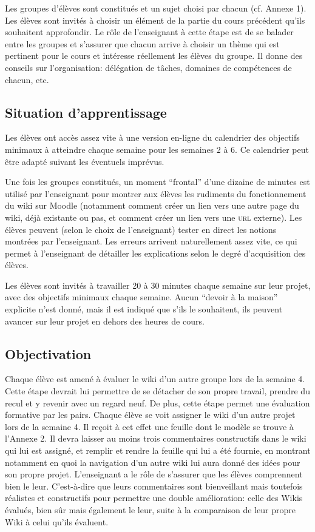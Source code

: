 \documentclass[11pt,bibliography=totoc]{scrartcl}
\newcommand\ajout[1]{{\color{blue} #1}}
\begin{document}
Les groupes d'élèves sont constitués et un sujet choisi par chacun (cf. Annexe
1). Les élèves sont invités à choisir un élément de la partie du cours précédent
qu'ils souhaitent approfondir. Le rôle de l'enseignant à cette étape est de se
balader entre les groupes et s'assurer que chacun arrive à choisir un thème qui
est pertinent pour le cours et intéresse réellement les élèves du groupe. \ajout {Il donne des conseils sur l'organisation: délégation de tâches, domaines de compétences de chacun, etc.}

\subsection{Situation d'apprentissage}
Les élèves ont accès assez vite à une version en-ligne du calendrier des
objectifs minimaux à atteindre chaque semaine pour les semaines 2 à 6. Ce
calendrier peut être adapté suivant les éventuels imprévus.

Une fois les groupes constitués, un moment ``frontal'' d'une dizaine de minutes
est utilisé par l'enseignant pour montrer aux élèves les rudiments du
fonctionnement du wiki sur Moodle (notamment comment créer un lien vers une
autre page du wiki, déjà existante ou pas, et comment créer un lien vers une
\textsc{url} externe). \ajout {Les élèves peuvent (selon le choix de l'enseignant) tester en direct les notions montrées par l'enseignant. Les erreurs arrivent naturellement assez vite, ce qui permet à l'enseignant de détailler les explications selon le degré d'acquisition des élèves.}

Les élèves sont invités à travailler 20 à 30 minutes chaque semaine sur leur
projet, avec des objectifs minimaux chaque semaine. Aucun ``devoir à la maison''
explicite n'est donné, mais il est indiqué que s'ils le souhaitent, ils peuvent
avancer sur leur projet en dehors des heures de cours.

\subsection{Objectivation}
Chaque élève est amené à évaluer le wiki d'un autre groupe lors de la semaine
4. Cette étape devrait lui permettre de se détacher de son propre travail,
prendre du recul et y revenir avec un regard neuf. De plus, cette étape permet
une évaluation formative par les pairs. Chaque élève se voit assigner le wiki
d'un autre projet lors de la semaine 4. Il reçoit à cet effet une feuille dont
le modèle se trouve à l'Annexe 2. Il devra laisser au moins trois commentaires
constructifs dans le wiki qui lui est assigné, et remplir et rendre la feuille
qui lui a été fournie, en montrant notamment en quoi la navigation d'un autre
wiki lui aura donné des idées pour son propre projet.
\ajout {
L'enseignant a le rôle de s'assurer que les élèves comprennent bien le leur. C'est-à-dire que leurs commentaires sont bienveillant mais toutefois réalistes et constructifs pour permettre une double amélioration: celle des Wikis évalués, bien sûr mais également le leur, suite à la comparaison de leur propre Wiki à celui qu'ils évaluent.
}
\end{document}
